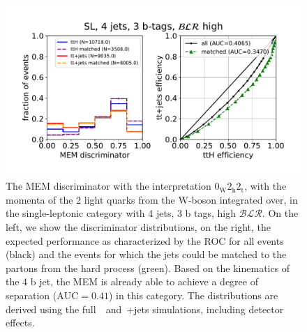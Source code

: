 \begin{figure}
\begin{centering}
\includegraphics[width = 1.0\textwidth]{figures/mem_sl_j4_t3_blrH.pdf}
\caption{The MEM discriminator with the interpretation $0_{\mathrm{W}} 2_{\mathrm{h}} 2_{\mathrm{t}}$, with the momenta of the 2 light quarks from the $\mathrm{W}$-boson integrated over, in the single-leptonic category with 4 jets, 3 b tags, high $\mathcal{BLR}$. On the left, we show the discriminator distributions, on the right, the expected performance as characterized by the ROC for all events (black) and the events for which the jets could be matched to the partons from the hard process (green). Based on the kinematics of the 4 b jet, the MEM is already able to achieve a degree of separation ($\mathrm{AUC} = 0.41$) in this category. The distributions are derived using the full~\ttHbb~and~\ttbar+jets simulations, including detector effects.}
\label{fig:mem_sl_j4_t3}
\end{centering}
\end{figure}

